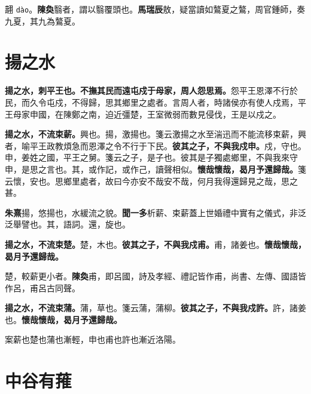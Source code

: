 \begin{quoting}翿 \texttt{dào}。\textbf{陳奐}翳者，謂以翳覆頭也。\textbf{馬瑞辰}敖，疑當讀如鷔夏之鷔，周官鍾師，奏九夏，其九為鷔夏。\end{quoting}

\section{揚之水}


\textbf{揚之水，刺平王也。不撫其民而遠屯戍于母家，周人怨思焉。}{\footnotesize 怨平王恩澤不行於民，而久令屯戍，不得歸，思其鄉里之處者。言周人者，時諸侯亦有使人戍焉，平王母家申國，在陳鄭之南，迫近彊楚，王室微弱而數見侵伐，王是以戍之。}

\textbf{揚之水，不流束薪。}{\footnotesize 興也。揚，激揚也。箋云激揚之水至湍迅而不能流移束薪，興者，喻平王政教煩急而恩澤之令不行于下民。}\textbf{彼其之子，不與我戍申。}{\footnotesize 戍，守也。申，姜姓之國，平王之舅。箋云之子，是子也。彼其是子獨處鄉里，不與我來守申，是思之言也。其，或作記，或作己，讀聲相似。}\textbf{懷哉懷哉，曷月予還歸哉。}{\footnotesize 箋云懷，安也。思鄉里處者，故曰今亦安不哉安不哉，何月我得還歸見之哉，思之甚。}

\begin{quoting}\textbf{朱熹}揚，悠揚也，水緩流之貌。\textbf{聞一多}析薪、束薪蓋上世婚禮中實有之儀式，非泛泛舉譬也。其，語詞。還，旋也。\end{quoting}

\textbf{揚之水，不流束楚。}{\footnotesize 楚，木也。}\textbf{彼其之子，不與我戍甫。}{\footnotesize 甫，諸姜也。}\textbf{懷哉懷哉，曷月予還歸哉。}

\begin{quoting}楚，較薪更小者。\textbf{陳奐}甫，即呂國，詩及孝經、禮記皆作甫，尚書、左傳、國語皆作呂，甫呂古同聲。\end{quoting}

\textbf{揚之水，不流束蒲。}{\footnotesize 蒲，草也。箋云蒲，蒲柳。}\textbf{彼其之子，不與我戍許。}{\footnotesize 許，諸姜也。}\textbf{懷哉懷哉，曷月予還歸哉。}

\begin{quoting}案薪也楚也蒲也漸輕，申也甫也許也漸近洛陽。\end{quoting}

\section{中谷有蓷}

